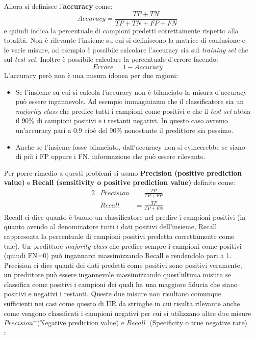 Allora si definisce l'\textbf{accuracy} come:
\begin{equation*}
Accuracy = \frac{TP + TN}{TP+TN+FP+FN}
\end{equation*}
e quindi indica la percentuale di campioni predetti correttamente rispetto alla totalità. Non è rilevante l'insieme su cui si definiscono la matrice di confusione e le varie misure, ad esempio è possibile calcolare l'accuracy sia sul \textit{training set} che sul \textit{test set}. Inoltre è possibile calcolare la percentuale d'errore facendo:
\begin{equation*}
Errore = 1 - Accuracy
\end{equation*}
 L'accuracy però non è una misura idonea per due ragioni:
 \begin{itemize}
 \item Se l'insieme su cui si calcola l'accuracy non è bilanciato la misura d'accuracy può essere ingannevole. Ad esempio immaginiamo che il  classificatore sia un \textit{majority class} che predice tutti i campioni come positivi e che il \textit{test set} abbia il 90\% di campioni positivi e i restanti negativi. In questo caso avremo un'accuracy pari a 0.9 cioè del 90\% nonostante il predittore sia pessimo.
 \item Anche se l'insieme fosse bilanciato, dall'accuracy non si evincerebbe se siano di più i FP oppure i FN, informazione che può essere rilevante.
 \end{itemize}
Per porre rimedio a questi problemi si usano \textbf{Precision (positive prediction value)} e \textbf{Recall (sensitivity o positive prediction value)} definite come:
\begin{alignat*}{2}
& Precision &= \frac{TP}{TP+FP}\\
& Recall &= \frac{TP}{TP+FN}
\end{alignat*}
Recall ci dice quanto è buono un classificatore nel predire i campioni positivi (in quanto avendo al denominatore tutti i dati positivi dell'insieme, Recall rappresenta la percentuale di campioni positivi predetta correttamente come tale). Un predittore \textit{majority class} che predice sempre i campioni come positivi (quindi FN=0) può ingannarci massimizzando Recall e rendendolo pari a 1. Precision ci dice quanti dei dati predetti come positivi sono positivi veramente; un predittore può essere ingannevole massimizzando quest'ultima misura se classifica come positivi i campioni dei quali ha una maggiore fiducia che siano positivi e negativi i restanti. Queste due misure non risultano comunque sufficienti nei casi come questo di \ac{IIR} da stringhe in cui risulta rilevante anche come vengono classificati i campioni negativi per cui si utilizzano altre due misure $Precision^{-}$(Negative prediction value) e $Recall^{-}$(Specificity o true negative rate) \cite{Bogdanov08} :
